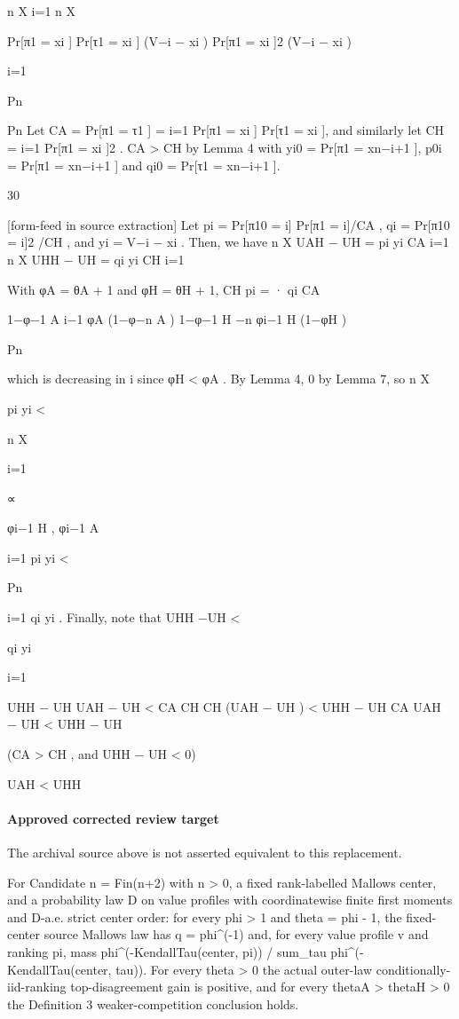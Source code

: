 \documentclass[10pt]{article}
\begin{document}
\begin{ReviewVerbatim}
n
X
i=1
n
X

Pr[π1 = xi ] Pr[τ1 = xi ] (V−i − xi )
Pr[π1 = xi ]2 (V−i − xi )

i=1

Pn

Pn
Let CA = Pr[π1 = τ1 ] = i=1 Pr[π1 = xi ] Pr[τ1 = xi ], and similarly let CH = i=1 Pr[π1 = xi ]2 . CA > CH
by Lemma 4 with yi0 = Pr[π1 = xn−i+1 ], p0i = Pr[π1 = xn−i+1 ] and qi0 = Pr[τ1 = xn−i+1 ].

30


[form-feed in source extraction]
Let pi = Pr[π10 = i] Pr[π1 = i]/CA , qi = Pr[π10 = i]2 /CH , and yi = V−i − xi . Then, we have
n
X
UAH − UH
=
pi yi
CA
i=1
n
X
UHH − UH
=
qi yi
CH
i=1

With φA = θA + 1 and φH = θH + 1,
CH
pi
=
·
qi
CA

1−φ−1
A
i−1
φA (1−φ−n
A )
1−φ−1
H
−n
φi−1
H (1−φH )

Pn

which is decreasing in i since φH < φA . By Lemma 4,
0 by Lemma 7, so
n
X

pi yi <

n
X

i=1

∝

φi−1
H
,
φi−1
A

i=1 pi yi <

Pn

i=1 qi yi . Finally, note that UHH −UH <

qi yi

i=1

UHH − UH
UAH − UH
<
CA
CH
CH (UAH − UH )
< UHH − UH
CA
UAH − UH < UHH − UH

(CA > CH , and UHH − UH < 0)

UAH < UHH
\end{ReviewVerbatim}

\paragraph{Approved corrected review target}
The archival source above is not asserted equivalent to this replacement.
\begin{ReviewVerbatim}
For Candidate n = Fin(n+2) with n > 0, a fixed rank-labelled Mallows center, and a probability law D on value profiles with coordinatewise finite first moments and D-a.e. strict center order: for every phi > 1 and theta = phi - 1, the fixed-center source Mallows law has q = phi^(-1) and, for every value profile v and ranking pi, mass phi^(-KendallTau(center, pi)) / sum_tau phi^(-KendallTau(center, tau)). For every theta > 0 the actual outer-law conditionally-iid-ranking top-disagreement gain is positive, and for every thetaA > thetaH > 0 the Definition 3 weaker-competition conclusion holds.
\end{ReviewVerbatim}
\end{document}
